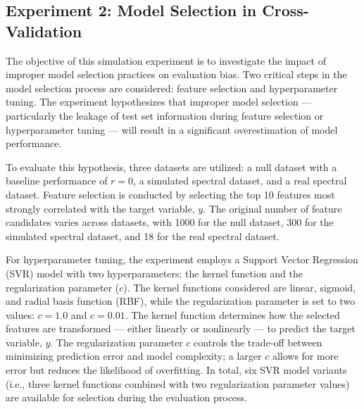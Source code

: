 \subsection{Experiment 2: Model Selection in Cross-Validation}

The objective of this simulation experiment is to investigate the impact of improper model selection practices on evaluation bias. Two critical steps in the model selection process are considered: feature selection and hyperparameter tuning. The experiment hypothesizes that improper model selection — particularly the leakage of test set information during feature selection or hyperparameter tuning — will result in a significant overestimation of model performance.

To evaluate this hypothesis, three datasets are utilized: a null dataset with a baseline performance of  $r = 0$, a simulated spectral dataset, and a real spectral dataset. Feature selection is conducted by selecting the top 10 features most strongly correlated with the target variable, $y$. The original number of feature candidates varies across datasets, with 1000 for the null dataset, 300 for the simulated spectral dataset, and 18 for the real spectral dataset.

For hyperparameter tuning, the experiment employs a Support Vector Regression (SVR) model with two hyperparameters: the kernel function and the regularization parameter ($c$). The kernel functions considered are linear, sigmoid, and radial basis function (RBF), while the regularization parameter is set to two values: $c = 1.0$  and  $c = 0.01$. The kernel function determines how the selected features are transformed — either linearly or nonlinearly — to predict the target variable, $y$. The regularization parameter $c$ controls the trade-off between minimizing prediction error and model complexity; a larger $c$ allows for more error but reduces the likelihood of overfitting. In total, six SVR model variants (i.e., three kernel functions combined with two regularization parameter values) are available for selection during the evaluation process.

